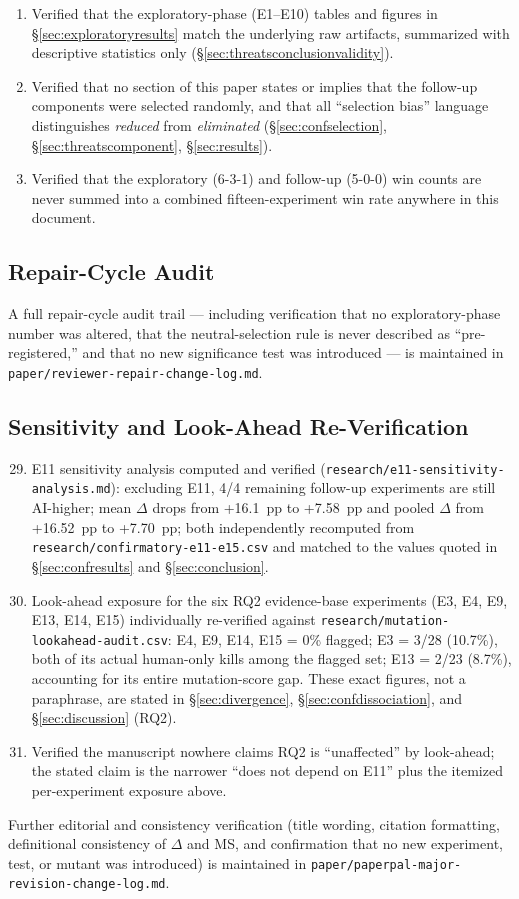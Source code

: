 \documentclass[10pt,conference]{IEEEtran}
\begin{document}
\begin{enumerate}
\item Verified that the exploratory-phase (E1--E10) tables and figures in \S\ref{sec:exploratoryresults} match the underlying raw artifacts, summarized with descriptive statistics only (\S\ref{sec:threatsconclusionvalidity}).
\item Verified that no section of this paper states or implies that the follow-up components were selected randomly, and that all ``selection bias'' language distinguishes \emph{reduced} from \emph{eliminated} (\S\ref{sec:confselection}, \S\ref{sec:threatscomponent}, \S\ref{sec:results}).
\item Verified that the exploratory (6-3-1) and follow-up (5-0-0) win counts are never summed into a combined fifteen-experiment win rate anywhere in this document.
\end{enumerate}

\subsection{Repair-Cycle Audit}
A full repair-cycle audit trail — including verification that no exploratory-phase number was altered, that the neutral-selection rule is never described as ``pre-registered,'' and that no new significance test was introduced — is maintained in \texttt{paper/reviewer-repair-change-log.md}.

\subsection{Sensitivity and Look-Ahead Re-Verification}
\begin{enumerate}
\setcounter{enumi}{28}
\item E11 sensitivity analysis computed and verified (\texttt{research/e11-sensitivity-analysis.md}): excluding E11, 4/4 remaining follow-up experiments are still AI-higher; mean $\Delta$ drops from +16.1~pp to +7.58~pp and pooled $\Delta$ from +16.52~pp to +7.70~pp; both independently recomputed from \texttt{research/confirmatory-e11-e15.csv} and matched to the values quoted in \S\ref{sec:confresults} and \S\ref{sec:conclusion}.
\item Look-ahead exposure for the six RQ2 evidence-base experiments (E3, E4, E9, E13, E14, E15) individually re-verified against \texttt{research/mutation-lookahead-audit.csv}: E4, E9, E14, E15 = 0\% flagged; E3 = 3/28 (10.7\%), both of its actual human-only kills among the flagged set; E13 = 2/23 (8.7\%), accounting for its entire mutation-score gap. These exact figures, not a paraphrase, are stated in \S\ref{sec:divergence}, \S\ref{sec:confdissociation}, and \S\ref{sec:discussion} (RQ2).
\item Verified the manuscript nowhere claims RQ2 is ``unaffected'' by look-ahead; the stated claim is the narrower ``does not depend on E11'' plus the itemized per-experiment exposure above.
\end{enumerate}

Further editorial and consistency verification (title wording, citation formatting, definitional consistency of $\Delta$ and MS, and confirmation that no new experiment, test, or mutant was introduced) is maintained in \texttt{paper/paperpal-major-revision-change-log.md}.
\end{document}
